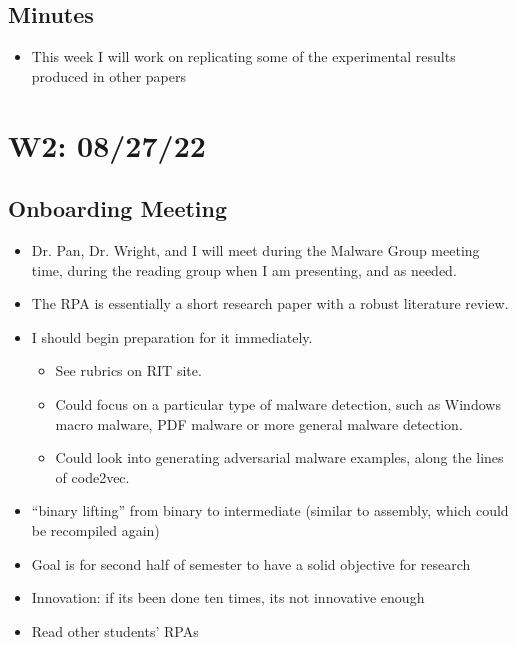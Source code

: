 \documentclass{article}
\begin{document}
\subsection*{Minutes}

\begin{itemize}
\item This week I will work on replicating some of the experimental results produced in other papers
\end{itemize}

\pagebreak


\section*{W2: 08/27/22}

\subsection*{Onboarding Meeting}

\begin{itemize}
	\item Dr. Pan, Dr. Wright, and I will meet during the Malware Group meeting time, during the reading group when I am presenting, and as needed.
	\item The RPA is essentially a short research paper with a robust literature review. 
	\item I should begin preparation for it immediately. 
	\begin{itemize}
		\item See rubrics on RIT site.
		\item Could focus on a particular type of malware detection, such as Windows macro malware, PDF malware or more general malware detection.
		\item Could look into generating adversarial malware examples, along the lines of code2vec.
	\end{itemize}
	\item ``binary lifting'' from binary to intermediate (similar to assembly, which could be recompiled again)
	\item Goal is for second half of semester to have a solid objective for research
	\item Innovation: if its been done ten times, its not innovative enough
	\item Read other students' RPAs
\end{itemize}
\end{document}
